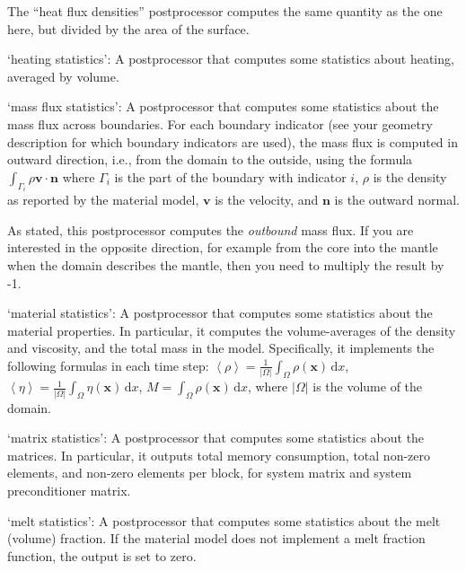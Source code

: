\begin{itemize}
The ``heat flux densities'' postprocessor computes the same quantity as the one here, but divided by the area of the surface.

`heating statistics': A postprocessor that computes some statistics about heating, averaged by volume. 

`mass flux statistics': A postprocessor that computes some statistics about the mass flux across boundaries. For each boundary indicator (see your geometry description for which boundary indicators are used), the mass flux is computed in outward direction, i.e., from the domain to the outside, using the formula $\int_{\Gamma_i} \rho \mathbf v \cdot \mathbf n$ where $\Gamma_i$ is the part of the boundary with indicator $i$, $\rho$ is the density as reported by the material model, $\mathbf v$ is the velocity, and $\mathbf n$ is the outward normal. 

As stated, this postprocessor computes the \textit{outbound} mass flux. If you are interested in the opposite direction, for example from the core into the mantle when the domain describes the mantle, then you need to multiply the result by -1.


`material statistics': A postprocessor that computes some statistics about the material properties. In particular, it computes the volume-averages of the density and viscosity, and the total mass in the model. Specifically, it implements the following formulas in each time step: $\left<\rho\right> = \frac{1}{|\Omega|} \int_\Omega \rho(\mathbf x) \, \text{d}x$, $\left<\eta\right> = \frac{1}{|\Omega|} \int_\Omega \eta(\mathbf x) \, \text{d}x$, $M = \int_\Omega \rho(\mathbf x) \, \text{d}x$, where $|\Omega|$ is the volume of the domain.

`matrix statistics': A postprocessor that computes some statistics about the matrices. In particular, it outputs total memory consumption, total non-zero elements, and non-zero elements per block, for system matrix and system preconditioner matrix.

`melt statistics': A postprocessor that computes some statistics about the melt (volume) fraction. If the material model does not implement a melt fraction function, the output is set to zero.


\end{itemize}
